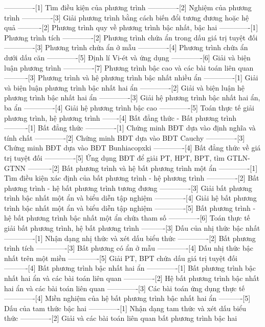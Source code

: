 -------------[1] Tìm điều kiện của phương trình
-------------[2] Nghiệm của phương trình
-------------[3] Giải phương trình bằng cách biến đổi tương đương hoặc hệ quả
----------[2] Phương trình quy về phương trình bậc nhất, bậc hai
-------------[1] Phương trình tích
-------------[2] Phương trình chứa ẩn trong dấu giá trị tuyệt đối
-------------[3] Phương trình chứa ẩn ở mẫu
-------------[4] Phương trình chứa ẩn dưới dấu căn
-------------[5] Định lí Vi-ét và ứng dụng
-------------[6] Giải và biện luận phương trình
-------------[7] Phương trình bậc cao và các bài toán liên quan
----------[3] Phương trình và hệ phương trình bậc nhất nhiều ẩn
-------------[1] Giải và biện luận phương trình bậc nhất hai ẩn
-------------[2] Giải và biện luận hệ phương trình bậc nhất hai ẩn
-------------[3] Giải hệ phương trình bậc nhất hai ẩn, ba ẩn
-------------[4] Giải hệ phương trình bậc cao
-------------[5] Toán thực tế giải phương trình, hệ phương trình
-------[4] Bất đẳng thức - Bất phương trình
----------[1] Bất đẳng thức
-------------[1] Chứng minh BĐT dựa vào định nghĩa và tính chất
-------------[2] Chứng minh BĐT dựa vào BĐT Cauchy
-------------[3] Chứng minh BĐT dựa vào BĐT Bunhiacopxki
-------------[4] Bất đẳng thức về giá trị tuyệt đối
-------------[5] Ứng dụng BĐT để giải PT, HPT, BPT, tìm GTLN-GTNN
----------[2] Bất phương trình và hệ bất phương trình một ẩn
-------------[1] Tìm điều kiện xác định của bất phương trình - hệ phương trình
-------------[2] Bất phương trình - hệ bất phương trình tương đương
-------------[3] Giải bất phương trình bậc nhất một ẩn và biểu diễn tập nghiệm
-------------[4] Giải hệ bất phương trình bậc nhất một ẩn và biểu diễn tập nghiệm
-------------[5] Bất phương trình - hệ bất phương trình bậc nhất một ẩn chứa tham số
-------------[6] Toán thực tế giải bất phương trình, hệ bất phương trình
----------[3] Dấu của nhị thức bậc nhất
-------------[1] Nhận dạng nhị thức và xét dấu biểu thức
-------------[2] Bất phương trình tích
-------------[3] Bất phương có ẩn ở mẫu
-------------[4] Dấu nhị thức bậc nhất trên một miền
-------------[5] Giải PT, BPT chứa dấu giá trị tuyệt đối
----------[4] Bất phương trình bậc nhất hai ẩn
-------------[1] Bất phương trình bậc nhất hai ẩn và các bài toán liên quan
-------------[2] Hệ bất phương trình bậc nhất hai ẩn và các bài toán liên quan
-------------[3] Các bài toán ứng dụng thực tế
-------------[4] Miền nghiệm của hệ bất phương trình bậc nhất hai ẩn
----------[5] Dấu của tam thức bậc hai
-------------[1] Nhận dạng tam thức và xét dấu biểu thức
-------------[2] Giải và các bài toán liên quan bất phương trình bậc hai
